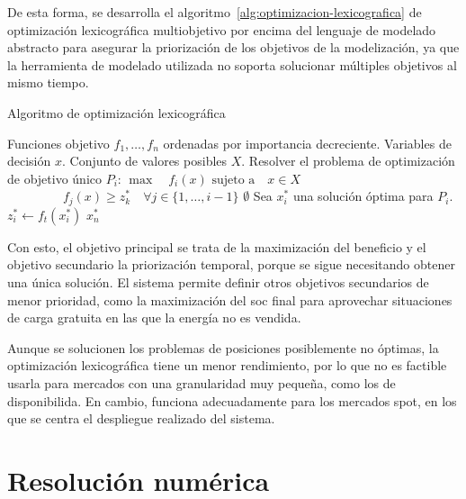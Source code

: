 De esta forma, se desarrolla el algoritmo~\ref{alg:optimizacion-lexicografica} de optimización lexicográfica multiobjetivo por encima del lenguaje de modelado abstracto para asegurar la priorización de los objetivos de la modelización, ya que la herramienta de modelado utilizada no soporta solucionar múltiples objetivos al mismo tiempo.

\begin{algorithm}
  \caption{Algoritmo de optimización lexicográfica}
  \label{alg:optimizacion-lexicografica}
  \begin{algorithmic}
    \Require Funciones objetivo \( f_{1}, \dots, f_{n} \) ordenadas por importancia decreciente.
    \Require Variables de decisión \( x \).
    \Require Conjunto de valores posibles \( X \).
    \State Resolver el problema de optimización de objetivo único \( P_{i} \):
    \Statex \hspace{\algorithmicindent} \( \max \quad f_{i}(x) \)
    \Statex \hspace{\algorithmicindent} \( \text{sujeto a} \quad x \in X \)
    \Statex \hspace{\algorithmicindent} \( \phantom{\text{sujeto a} \quad} f_{j}(x) \geq z_k^* \quad \forall j \in \{1, \dots, i - 1\} \)
    \State \Return \( \emptyset \)
    \EndIf
    \State Sea \( x^{*}_{i} \) una solución óptima para \( P_{i} \).
    \State \( z^{*}_{i} \gets f_t(x^{*}_{i}) \) 
    \EndFor
    \State \Return \( x^{*}_{n} \)
  \end{algorithmic}
\end{algorithm}

Con esto, el objetivo principal se trata de la maximización del beneficio y el objetivo secundario la priorización temporal, porque se sigue necesitando obtener una única solución. El sistema permite definir otros objetivos secundarios de menor prioridad, como la maximización del \gls{soc} final para aprovechar situaciones de carga gratuita en las que la energía no es vendida.

Aunque se solucionen los problemas de posiciones posiblemente no óptimas, la optimización lexicográfica tiene un menor rendimiento, por lo que no es factible usarla para mercados con una granularidad muy pequeña, como los de disponibilida. En cambio, funciona adecuadamente para los mercados spot, en los que se centra el despliegue realizado del sistema.

\section{Resolución numérica}
\label{makereference5.5}


